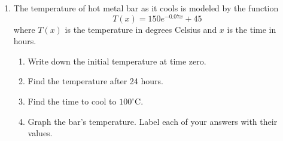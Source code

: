 \documentclass[12pt, twoside]{article}
\begin{document}
\begin{enumerate}
\item The temperature of hot metal bar as it cools is modeled by the function 
    \[ T(x)=150e^{-0.07x}+45 \] where $T(x)$
    is the temperature in degrees Celsius and $x$ is the time in hours.
    \begin{enumerate}[itemsep=1cm]
        \item Write down the initial temperature at time zero.
        \item Find the temperature after 24 hours.
        \item Find the time to cool to $100^\circ$C.
        \item Graph the bar's temperature. Label each of your answers with their values.
    \end{enumerate}
    \begin{center}
    \end{center}

\end{enumerate}
\end{document}
